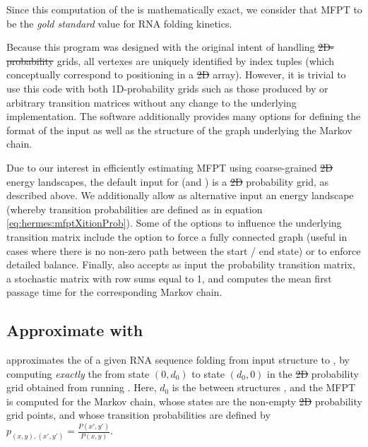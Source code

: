 \documentclass[11pt, oneside]{Thesis} %
\providecommand{\DIFadd}[1]{{\protect\color{blue}\uwave{#1}}} %
\providecommand{\DIFdel}[1]{{\protect\color{red}\sout{#1}}}                      %
\providecommand{\DIFaddbegin}{} %
\providecommand{\DIFaddend}{} %
\providecommand{\DIFdelbegin}{} %
\providecommand{\DIFdelend}{} %
\begin{document}
Since this computation of the
\mfpt is mathematically exact, we consider that MFPT
to be the {\em gold standard} value for RNA folding kinetics.

Because this program was designed with the original intent
of handling \DIFdelbegin \DIFdel{2D-probability }\DIFdelend \DIFaddbegin \twoD \DIFadd{probability }\DIFaddend grids, all vertexes are uniquely identified
by index tuples (which conceptually correspond to positioning in a \DIFdelbegin \DIFdel{2D
}\DIFdelend \DIFaddbegin \twoD
\DIFaddend array). However, it is trivial to use this code with both
1D-probability grids such as those produced by \fftbor
\citep{senter.po12} or arbitrary transition matrices without any change
to the underlying implementation. The software additionally provides
many options for defining the format of the input as well as the
structure of the graph underlying the
Markov chain.

Due to our interest in efficiently estimating MFPT using coarse-grained \DIFdelbegin \DIFdel{2D
}\DIFdelend \DIFaddbegin \twoD
\DIFaddend energy landscapes, the default input for \rnamfpt (and \rnaeq) is a \DIFdelbegin \DIFdel{2D
}\DIFdelend \DIFaddbegin \twoD
\DIFaddend probability grid, as described above. We additionally allow as alternative input
an energy landscape (whereby transition probabilities are defined as in
equation \ref{eq:hermes:mfptXitionProb}).
Some of the options to influence the underlying transition matrix
include the option to force a fully
connected graph (useful in cases where there is no non-zero path
between the start / end state) or to enforce detailed balance.
Finally, \rnamfpt also accepts as input the probability transition matrix,
a stochastic matrix with row sums equal to 1, and computes the mean
first passage time for the corresponding Markov chain.

\subsection{Approximate \mfpt with \fftmfpt}
\label{subsec:hermes:fftmfpt}

\fftmfpt approximates the \mfpt of a given RNA
sequence folding from input structure \strA to \strB, by
computing {\em exactly} the \mfpt from state $(0,d_0)$ to state
$(d_0,0)$ in the \DIFdelbegin \DIFdel{2D }\DIFdelend \DIFaddbegin \twoD \DIFaddend probability grid obtained from running
\ffttwo. Here, $d_0$ is the \bpd between structures
\strAB, and the MFPT is computed for the Markov chain, whose states are
the non-empty \DIFdelbegin \DIFdel{2D }\DIFdelend \DIFaddbegin \twoD \DIFaddend probability grid points, and whose transition
probabilities are defined by $p_{(x,y),(x',y')} =
\frac{P(x',y')}{P(x,y)}$.
\end{document}

